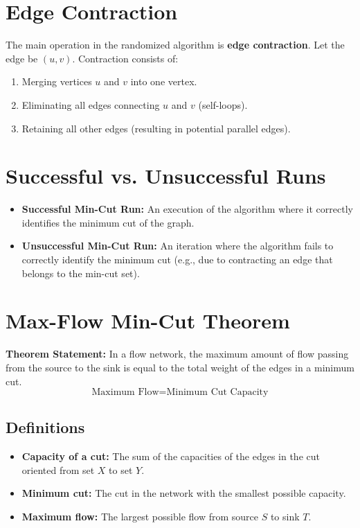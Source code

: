 \documentclass[11pt]{article}
\begin{document}
\section{Edge Contraction}
The main operation in the randomized algorithm is \textbf{edge contraction}.
Let the edge be $(u, v)$. Contraction consists of:
\begin{enumerate}
    \item Merging vertices $u$ and $v$ into one vertex.
    \item Eliminating all edges connecting $u$ and $v$ (self-loops).
    \item Retaining all other edges (resulting in potential parallel edges).
\end{enumerate}

\section{Successful vs. Unsuccessful Runs}
\begin{itemize}
    \item \textbf{Successful Min-Cut Run:} An execution of the algorithm where it correctly identifies the minimum cut of the graph.
    \item \textbf{Unsuccessful Min-Cut Run:} An iteration where the algorithm fails to correctly identify the minimum cut (e.g., due to contracting an edge that belongs to the min-cut set).
\end{itemize}

\section{Max-Flow Min-Cut Theorem}
\textbf{Theorem Statement:} In a flow network, the maximum amount of flow passing from the source to the sink is equal to the total weight of the edges in a minimum cut.
\[ \text{Maximum Flow} = \text{Minimum Cut Capacity} \]

\subsection*{Definitions}
\begin{itemize}
    \item \textbf{Capacity of a cut:} The sum of the capacities of the edges in the cut oriented from set $X$ to set $Y$.
    \item \textbf{Minimum cut:} The cut in the network with the smallest possible capacity.
    \item \textbf{Maximum flow:} The largest possible flow from source $S$ to sink $T$.
\end{itemize}
\end{document}
